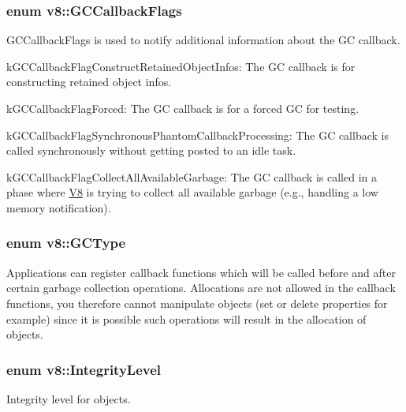 \subsubsection[{\texorpdfstring{G\+C\+Callback\+Flags}{GCCallbackFlags}}]{\setlength{\rightskip}{0pt plus 5cm}enum {\bf v8\+::\+G\+C\+Callback\+Flags}}\hypertarget{namespacev8_a247c37a849f4d6c293b9b16e94e1944b}{}\label{namespacev8_a247c37a849f4d6c293b9b16e94e1944b}
G\+C\+Callback\+Flags is used to notify additional information about the GC callback.
\begin{DoxyItemize}
\item k\+G\+C\+Callback\+Flag\+Construct\+Retained\+Object\+Infos\+: The GC callback is for constructing retained object infos.
\item k\+G\+C\+Callback\+Flag\+Forced\+: The GC callback is for a forced GC for testing.
\item k\+G\+C\+Callback\+Flag\+Synchronous\+Phantom\+Callback\+Processing\+: The GC callback is called synchronously without getting posted to an idle task.
\item k\+G\+C\+Callback\+Flag\+Collect\+All\+Available\+Garbage\+: The GC callback is called in a phase where \hyperlink{classv8_1_1_v8}{V8} is trying to collect all available garbage (e.\+g., handling a low memory notification). 
\end{DoxyItemize}
\subsubsection[{\texorpdfstring{G\+C\+Type}{GCType}}]{\setlength{\rightskip}{0pt plus 5cm}enum {\bf v8\+::\+G\+C\+Type}}\hypertarget{namespacev8_ac109d6f27e0c0f9ef4e98bcf7a806cf2}{}\label{namespacev8_ac109d6f27e0c0f9ef4e98bcf7a806cf2}
Applications can register callback functions which will be called before and after certain garbage collection operations. Allocations are not allowed in the callback functions, you therefore cannot manipulate objects (set or delete properties for example) since it is possible such operations will result in the allocation of objects. 
\subsubsection[{\texorpdfstring{Integrity\+Level}{IntegrityLevel}}]{\setlength{\rightskip}{0pt plus 5cm}enum {\bf v8\+::\+Integrity\+Level}\hspace{0.3cm}{\ttfamily [strong]}}\hypertarget{namespacev8_a02642d03ff1eecc2fd358626499c2e30}{}\label{namespacev8_a02642d03ff1eecc2fd358626499c2e30}
Integrity level for objects. 
